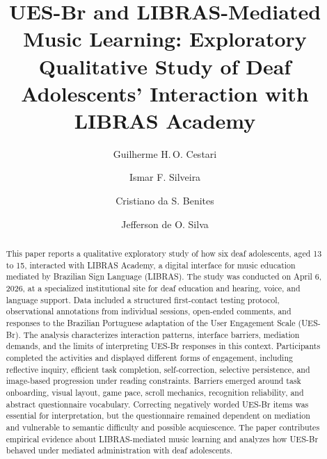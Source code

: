 \documentclass{llncs}
\begin{document}
\title{UES-Br and LIBRAS-Mediated Music Learning: Exploratory Qualitative Study
of Deaf Adolescents' Interaction with LIBRAS Academy}


\author{Guilherme H.\,O. Cestari \and
Ismar F. Silveira \and
Cristiano da S. Benites \and
Jefferson de O. Silva}



\maketitle

\begin{abstract}
This paper reports a qualitative exploratory study of how six deaf adolescents, aged
13 to 15, interacted with LIBRAS Academy, a digital interface for music education
mediated by Brazilian Sign Language (LIBRAS). The study was conducted on April 6,
2026, at a specialized institutional site for deaf education and hearing, voice, and
language support. Data included a structured first-contact testing protocol,
observational annotations from individual sessions, open-ended comments, and responses
to the Brazilian Portuguese adaptation of the User Engagement Scale (UES-Br).
The analysis characterizes interaction patterns, interface barriers, mediation demands,
and the limits of interpreting UES-Br responses in this context. Participants completed
the activities and displayed different forms of
engagement, including reflective inquiry, efficient task completion, self-correction,
selective persistence, and image-based progression under reading constraints. Barriers
emerged around task onboarding, visual layout, game pace, scroll mechanics, recognition
reliability, and abstract questionnaire vocabulary. Correcting negatively worded UES-Br
items was essential for interpretation, but the questionnaire remained dependent on
mediation and vulnerable to semantic difficulty and possible acquiescence. The paper
contributes empirical evidence about LIBRAS-mediated music learning and analyzes how
UES-Br behaved under mediated administration with deaf adolescents.
\end{abstract}
\end{document}
